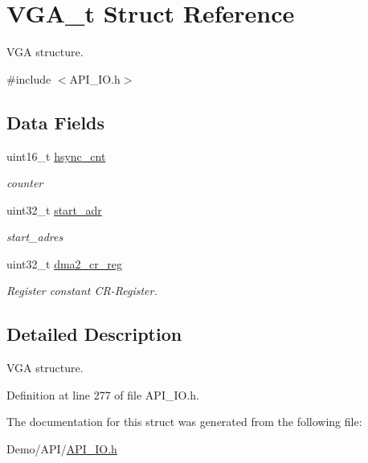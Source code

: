 \hypertarget{struct_v_g_a__t}{}\section{V\+G\+A\+\_\+t Struct Reference}
\label{struct_v_g_a__t}


V\+GA structure.  




{\ttfamily \#include $<$A\+P\+I\+\_\+\+I\+O.\+h$>$}

\subsection*{Data Fields}
\begin{DoxyCompactItemize}
\item 
\mbox{\label{struct_v_g_a__t_a649bc185f93377aec7fa1c136dd2add0}} 
uint16\+\_\+t \hyperlink{struct_v_g_a__t_a649bc185f93377aec7fa1c136dd2add0}{hsync\+\_\+cnt}
\begin{DoxyCompactList}\small\item\em counter \end{DoxyCompactList}\item 
\mbox{\label{struct_v_g_a__t_a7f47a855ae47844b419d75797f00fbbb}} 
uint32\+\_\+t \hyperlink{struct_v_g_a__t_a7f47a855ae47844b419d75797f00fbbb}{start\+\_\+adr}
\begin{DoxyCompactList}\small\item\em start\+\_\+adres \end{DoxyCompactList}\item 
\mbox{\label{struct_v_g_a__t_a1fc3c1405cc22f5d4fc21eb58c47c06a}} 
uint32\+\_\+t \hyperlink{struct_v_g_a__t_a1fc3c1405cc22f5d4fc21eb58c47c06a}{dma2\+\_\+cr\+\_\+reg}
\begin{DoxyCompactList}\small\item\em Register constant C\+R-\/\+Register. \end{DoxyCompactList}\end{DoxyCompactItemize}


\subsection{Detailed Description}
V\+GA structure. 

Definition at line 277 of file A\+P\+I\+\_\+\+I\+O.\+h.



The documentation for this struct was generated from the following file\+:\begin{DoxyCompactItemize}
\item 
Demo/\+A\+P\+I/\hyperlink{_a_p_i___i_o_8h}{A\+P\+I\+\_\+\+I\+O.\+h}\end{DoxyCompactItemize}
